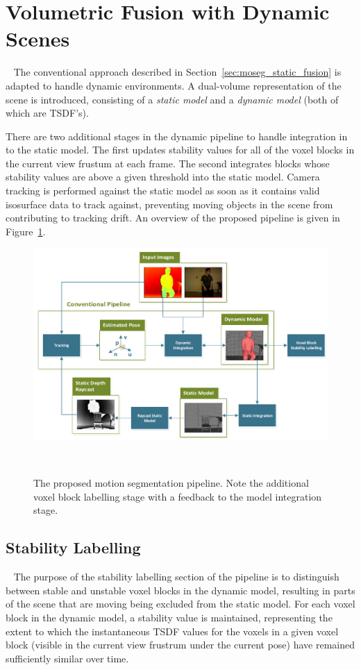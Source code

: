 \section{Volumetric Fusion with Dynamic Scenes}
~\label{sec:moseg_dynamic_fusion}
The conventional approach described in Section~\ref{sec:moseg_static_fusion} is adapted to handle dynamic 
environments. A dual-volume representation of the scene is introduced, consisting of a \emph{static model}
and a \emph{dynamic model} (both of which are TSDF's).

There are two additional stages in the dynamic pipeline to handle integration in
to the static model. The first updates stability values for all of the voxel
blocks in the current view frustum at each frame. The second integrates blocks
whose stability values are above a given threshold into the static model.
Camera tracking is performed against the static model as soon as it contains
valid isosurface data to track against, preventing moving objects in the scene
from contributing to tracking drift. An overview of the proposed pipeline is 
given in Figure~\ref{figure:moseg_pipeline}.

\begin{landscape}
\begin{figure}[!htbp]
  \centering
  \includegraphics[width=.9\linewidth]{figures/moseg/pipeline.pdf}
  \caption[Motion Segmentation Pipeline]{The proposed motion segmentation pipeline. 
  Note the additional voxel block labelling stage with a feedback to the model 
  integration stage.}
~\label{figure:moseg_pipeline}
\end{figure}
\end{landscape}

\subsection{Stability Labelling}
~\label{sub:moseg_stability_labelling}
The purpose of the stability labelling section of the pipeline is to distinguish
between stable and unstable voxel blocks in the dynamic model, resulting in
parts of the scene that are moving being excluded from the static model. For each voxel 
block in the dynamic model, a stability value is maintained, 
representing the extent to which the instantaneous TSDF values for the voxels 
in a given voxel block (visible in the current view frustrum under the current 
pose) have remained sufficiently similar over time.

